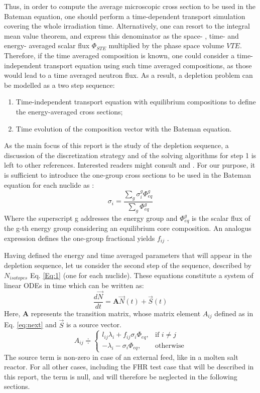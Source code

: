 \documentclass[a4paper,titlepage]{article}
\newcommand{\nvec}{\ensuremath{\vec{N}}}
\newcommand{\svec}{\ensuremath{\vec{S}}}
\begin{document}
Thus, in order to compute the average microscopic cross section to be used in the Bateman equation, one should perform a time-dependent transport simulation covering the whole irradiation time. Alternatively, one can resort to the integral mean value theorem, and express this denominator  as the space- , time- and energy- averaged scalar flux $\Phi_{STE}$ multiplied by the phase space volume $V T E$. Therefore, if the time averaged composition is known, one could consider a time-independent transport equation using such time averaged compositions, as those would lead to a time averaged neutron flux. 
As a result, a depletion problem can be modelled as a two step sequence:
\begin{enumerate}
    \item Time-independent transport equation with equilibrium compositions to define the energy-averaged cross sections;
    \item Time evolution of the composition vector with the Bateman equation.
\end{enumerate}
As the main focus of this report is the study of the depletion sequence, a discussion of the discretization strategy and of the solving algorithms for step 1 is left to other references. Interested readers might consult \cite{lewis1984computational} and \cite{bell1970nuclear}.
For our purpose, it is sufficient to introduce the one-group cross sections to be used in the Bateman equation for each nuclide as \cite{kotlyar2015one}:
\begin{equation}
    \sigma_i=\frac{\sum_g\sigma_i^g\Phi_{eq}^g}{\sum_g\Phi_{eq}^g}
\end{equation}
Where the superscript g addresses the energy group and $\Phi_{eq}^g$ is the scalar flux of the g-th energy group considering an equilibrium core composition. An analogus expression defines the one-group fractional yields $f_{ij}$ .

Having defined the energy and time averaged parameters that will appear in the depletion sequence, let us consider the second step of the sequence, described by $N_{isotopes}$ Eq. \ref{Eq:1} (one for each nuclide). These equations constitute a system of linear ODEs in time which can be written as:
\begin{equation}
    \frac{d\nvec}{dt}=\textbf{A}\nvec(t)+\svec(t)
    \label{eq:ode}
\end{equation}
Here, $\textbf{A}$ represents the transition matrix, whose matrix element $A_{ij}$ defined as in Eq. \ref{eq:next} and $\svec$ is a source vector. 
\begin{equation}
    A_{ij}\doteqdot 
\begin{cases}
    l_{ij}\lambda_i+f_{ij}\sigma_i\Phi_{eq},& \text{if } i\neq j\\
    -\lambda_i -\sigma_i\Phi_{eq},              & \text{otherwise}
\end{cases}
\label{eq:next}
\end{equation}
The source term is non-zero in case of an external feed, like in a molten salt reactor. For all other cases, including the FHR test case that will be described in this report, the term is null, and will therefore be neglected in the following sections.
\end{document}
